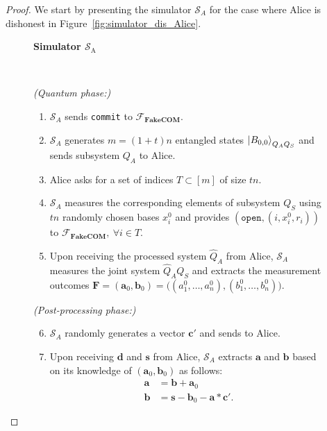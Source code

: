 \begin{proof}

We start by presenting the simulator $\mathcal{S}_A$ for the case where Alice is dishonest in Figure~\ref{fig:simulator_dis_Alice}.

\begin{figure}[h!]
    \centering
        \begin{tcolorbox}
            
            \centerline{\textbf{Simulator $\mathcal{S}_{\text{A}}$}}
            
            \

    \textit{(Quantum phase:)}
    
    \begin{enumerate}
        \item $\mathcal{S}_A$ sends \texttt{commit} to $\mathcal{F}_{\textbf{FakeCOM}}$.
        \item  $\mathcal{S}_A$ generates $ m=(1+t)n$ entangled states $\ket{B_{0,0}}_{Q_A Q_S}$ and sends subsystem $Q_A$ to Alice. 
        \item Alice asks for a set of indices $T  \subset[m] $ of size $tn$.
        \item $\mathcal{S}_A$ measures the corresponding elements of subsystem $Q_S$ using $tn$ randomly chosen bases $x^0_i$ and provides $(\texttt{open}, (i, x^0_i, r_i))$ to $\mathcal{F}_{\textbf{FakeCOM}},\  \forall i\in T$. 
        \item Upon receiving the processed system $\hat{Q}_A$ from Alice, $\mathcal{S}_A$ measures the joint system $\hat{Q}_A Q_S$ and extracts the measurement outcomes $\mathbf{F} = (\bm{a}_0, \bm{b}_0) = \big( (a^0_1,\ldots,a^0_n), (b^0_1,\ldots,b^0_n) \big)$.
    \end{enumerate}
    
    \textit{(Post-processing phase:)}
     
    \begin{enumerate}
    \setcounter{enumi}{5} 
        \item  $\mathcal{S}_A$ randomly generates a vector $\bm{c}'$ and sends to Alice.
        \item Upon receiving $\bm{d}$ and $\bm{s}$ from Alice, $\mathcal{S}_A$ extracts $\bm{a}$ and $\bm{b}$ based on its knowledge of $(\bm{a}_0, \bm{b}_0)$ as follows:
        \begin{equation}
            \begin{split}
                \bm{a} &= \bm{b} + \bm{a}_0 \\
                \bm{b} &= \bm{s} - \bm{b}_0 - \bm{a}  *\bm{c}'.
            \end{split}
        \label{eqn:extract_1}
        \end{equation}
        

\end{enumerate}
\end{tcolorbox}
\end{figure}
\end{proof}
